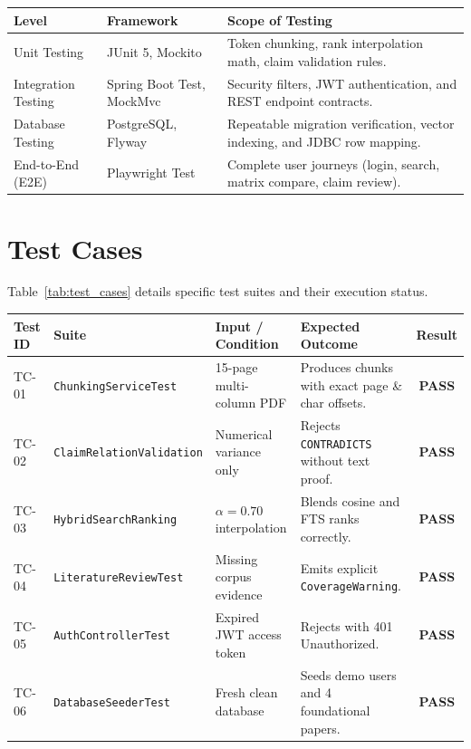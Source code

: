 \documentclass[11pt,a4paper,titlepage]{report}
\begin{document}
\begin{center}
\label{tab:testing_levels}
\vspace{3pt}
\begin{tabularx}{\textwidth}{llX}
\toprule
\textbf{Level} & \textbf{Framework} & \textbf{Scope of Testing} \\
\midrule
Unit Testing & JUnit 5, Mockito & Token chunking, rank interpolation math, claim validation rules. \\
Integration Testing & Spring Boot Test, MockMvc & Security filters, JWT authentication, and REST endpoint contracts. \\
Database Testing & PostgreSQL, Flyway & Repeatable migration verification, vector indexing, and JDBC row mapping. \\
End-to-End (E2E) & Playwright Test & Complete user journeys (login, search, matrix compare, claim review). \\
\bottomrule
\end{tabularx}
\end{center}

\section{Test Cases}
Table~\ref{tab:test_cases} details specific test suites and their execution status.

\begin{center}
\label{tab:test_cases}
\vspace{3pt}
\begin{tabularx}{\textwidth}{llXXc}
\toprule
\textbf{Test ID} & \textbf{Suite} & \textbf{Input / Condition} & \textbf{Expected Outcome} & \textbf{Result} \\
\midrule
TC-01 & \texttt{ChunkingServiceTest} & 15-page multi-column PDF & Produces chunks with exact page \& char offsets. & \textbf{PASS} \\
TC-02 & \texttt{ClaimRelationValidation} & Numerical variance only & Rejects \texttt{CONTRADICTS} without text proof. & \textbf{PASS} \\
TC-03 & \texttt{HybridSearchRanking} & $\alpha = 0.70$ interpolation & Blends cosine and FTS ranks correctly. & \textbf{PASS} \\
TC-04 & \texttt{LiteratureReviewTest} & Missing corpus evidence & Emits explicit \texttt{CoverageWarning}. & \textbf{PASS} \\
TC-05 & \texttt{AuthControllerTest} & Expired JWT access token & Rejects with 401 Unauthorized. & \textbf{PASS} \\
TC-06 & \texttt{DatabaseSeederTest} & Fresh clean database & Seeds demo users and 4 foundational papers. & \textbf{PASS} \\
\bottomrule
\end{tabularx}
\end{center}
\end{document}
